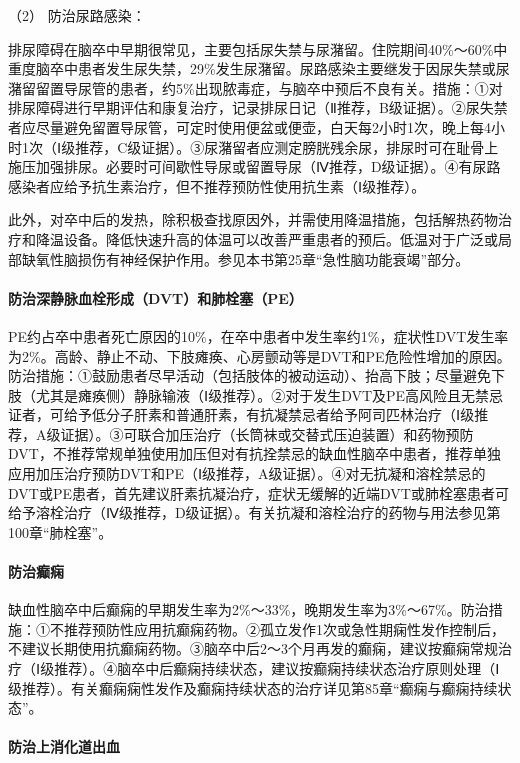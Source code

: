 \hypertarget{text00242.htmlux5cux23CHP8-1-2-3-3-8-2}{}
（2） 防治尿路感染：

排尿障碍在脑卒中早期很常见，主要包括尿失禁与尿潴留。住院期间40\%～60\%中重度脑卒中患者发生尿失禁，29\%发生尿潴留。尿路感染主要继发于因尿失禁或尿潴留留置导尿管的患者，约5\%出现脓毒症，与脑卒中预后不良有关。措施：①对排尿障碍进行早期评估和康复治疗，记录排尿日记（Ⅱ推荐，B级证据）。②尿失禁者应尽量避免留置导尿管，可定时使用便盆或便壶，白天每2小时1次，晚上每4小时1次（Ⅰ级推荐，C级证据）。③尿潴留者应测定膀胱残余尿，排尿时可在耻骨上施压加强排尿。必要时可间歇性导尿或留置导尿（Ⅳ推荐，D级证据）。④有尿路感染者应给予抗生素治疗，但不推荐预防性使用抗生素（Ⅰ级推荐）。

此外，对卒中后的发热，除积极查找原因外，并需使用降温措施，包括解热药物治疗和降温设备。降低快速升高的体温可以改善严重患者的预后。低温对于广泛或局部缺氧性脑损伤有神经保护作用。参见本书第25章“急性脑功能衰竭”部分。

\paragraph{防治深静脉血栓形成（DVT）和肺栓塞（PE）}

PE约占卒中患者死亡原因的10\%，在卒中患者中发生率约1\%，症状性DVT发生率为2\%。高龄、静止不动、下肢瘫痪、心房颤动等是DVT和PE危险性增加的原因。防治措施：①鼓励患者尽早活动（包括肢体的被动运动）、抬高下肢；尽量避免下肢（尤其是瘫痪侧）静脉输液（Ⅰ级推荐）。②对于发生DVT及PE高风险且无禁忌证者，可给予低分子肝素和普通肝素，有抗凝禁忌者给予阿司匹林治疗（Ⅰ级推荐，A级证据）。③可联合加压治疗（长筒袜或交替式压迫装置）和药物预防DVT，不推荐常规单独使用加压但对有抗拴禁忌的缺血性脑卒中患者，推荐单独应用加压治疗预防DVT和PE（Ⅰ级推荐，A级证据）。④对无抗凝和溶栓禁忌的DVT或PE患者，首先建议肝素抗凝治疗，症状无缓解的近端DVT或肺栓塞患者可给予溶栓治疗（Ⅳ级推荐，D级证据）。有关抗凝和溶栓治疗的药物与用法参见第100章“肺栓塞”。

\paragraph{防治癫痫}

缺血性脑卒中后癫痫的早期发生率为2\%～33\%，晚期发生率为3\%～67\%。防治措施：①不推荐预防性应用抗癫痫药物。②孤立发作1次或急性期痫性发作控制后，不建议长期使用抗癫痫药物。③脑卒中后2～3个月再发的癫痫，建议按癫痫常规治疗（Ⅰ级推荐）。④脑卒中后癫痫持续状态，建议按癫痫持续状态治疗原则处理（Ⅰ级推荐）。有关癫痫痫性发作及癫痫持续状态的治疗详见第85章“癫痫与癫痫持续状态”。

\paragraph{防治上消化道出血}

